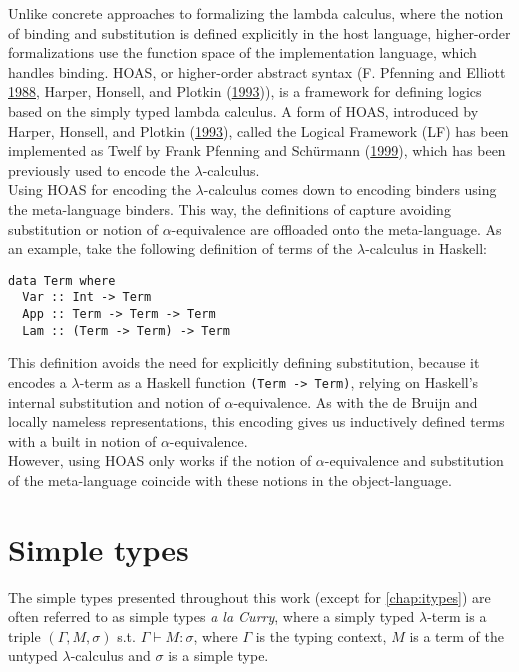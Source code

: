 \documentclass[a4paper, 12pt, twoside]{style/ociamthesis}
\theoremstyle{plain}
\theoremstyle{definition}
\theoremstyle{remark}
\begin{document}
Unlike concrete approaches to formalizing the lambda calculus, where the
notion of binding and substitution is defined explicitly in the host
language, higher-order formalizations use the function space of the
implementation language, which handles binding. HOAS, or higher-order
abstract syntax (F. Pfenning and Elliott
\protect\hyperlink{ref-pfenning88}{1988}, Harper, Honsell, and Plotkin
(\protect\hyperlink{ref-harper93}{1993})), is a framework for defining
logics based on the simply typed lambda calculus. A form of HOAS,
introduced by Harper, Honsell, and Plotkin
(\protect\hyperlink{ref-harper93}{1993}), called the Logical Framework
(LF) has been implemented as Twelf by Frank Pfenning and Schürmann
(\protect\hyperlink{ref-pfenning99}{1999}), which has been previously
used to encode the \(\lambda\)-calculus.\\
Using HOAS for encoding the \(\lambda\)-calculus comes down to encoding
binders using the meta-language binders. This way, the definitions of
capture avoiding substitution or notion of \(\alpha\)-equivalence are
offloaded onto the meta-language. As an example, take the following
definition of terms of the \(\lambda\)-calculus in Haskell:

\begin{verbatim}
data Term where
  Var :: Int -> Term
  App :: Term -> Term -> Term
  Lam :: (Term -> Term) -> Term
\end{verbatim}

This definition avoids the need for explicitly defining substitution,
because it encodes a \(\lambda\)-term as a Haskell function
\texttt{(Term -> Term)}, relying on Haskell's internal substitution and
notion of \(\alpha\)-equivalence. As with the de Bruijn and locally
nameless representations, this encoding gives us inductively defined
terms with a built in notion of \(\alpha\)-equivalence.\\
However, using HOAS only works if the notion of \(\alpha\)-equivalence
and substitution of the meta-language coincide with these notions in the
object-language.

\newpage

\section{Simple types}\label{simple-types}

The simple types presented throughout this work (except for
\cref{chap:itypes}) are often referred to as simple types \emph{a la
Curry}, where a simply typed \(\lambda\)-term is a triple
\((\Gamma, M, \sigma)\) s.t. \(\Gamma \vdash M : \sigma\), where
\(\Gamma\) is the typing context, \(M\) is a term of the untyped
\(\lambda\)-calculus and \(\sigma\) is a simple type.
\end{document}
